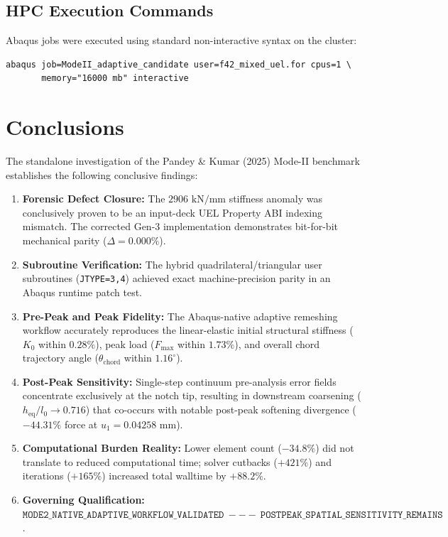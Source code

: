 \documentclass[11pt,a4paper]{article}
\begin{document}
\subsection{HPC Execution Commands}
Abaqus jobs were executed using standard non-interactive syntax on the cluster:
\begin{verbatim}
abaqus job=ModeII_adaptive_candidate user=f42_mixed_uel.for cpus=1 \
       memory="16000 mb" interactive
\end{verbatim}

\section{Conclusions}

The standalone investigation of the Pandey \& Kumar (2025) Mode-II benchmark establishes the following conclusive findings:
\begin{enumerate}[leftmargin=*]
    \item \textbf{Forensic Defect Closure:} The $2906\text{ kN/mm}$ stiffness anomaly was conclusively proven to be an input-deck UEL Property ABI indexing mismatch. The corrected Gen-3 implementation demonstrates bit-for-bit mechanical parity ($\Delta = 0.000\%$).
    \item \textbf{Subroutine Verification:} The hybrid quadrilateral/triangular user subroutines (\texttt{JTYPE=3,4}) achieved exact machine-precision parity in an Abaqus runtime patch test.
    \item \textbf{Pre-Peak and Peak Fidelity:} The Abaqus-native adaptive remeshing workflow accurately reproduces the linear-elastic initial structural stiffness ($K_0$ within $0.28\%$), peak load ($F_{\max}$ within $1.73\%$), and overall chord trajectory angle ($\theta_{\mathrm{chord}}$ within $1.16^\circ$).
    \item \textbf{Post-Peak Sensitivity:} Single-step continuum pre-analysis error fields concentrate exclusively at the notch tip, resulting in downstream coarsening ($h_{\mathrm{eq}}/l_0 \to 0.716$) that co-occurs with notable post-peak softening divergence ($-44.31\%$ force at $u_1 = 0.04258\text{ mm}$).
    \item \textbf{Computational Burden Reality:} Lower element count ($-34.8\%$) did not translate to reduced computational time; solver cutbacks ($+421\%$) and iterations ($+165\%$) increased total walltime by $+88.2\%$.
    \item \textbf{Governing Qualification:} $\mathtt{MODE2\_NATIVE\_ADAPTIVE\_WORKFLOW\_VALIDATED\ --- \ POSTPEAK\_SPATIAL\_SENSITIVITY\_REMAINS}$.
\end{enumerate}
\end{document}

